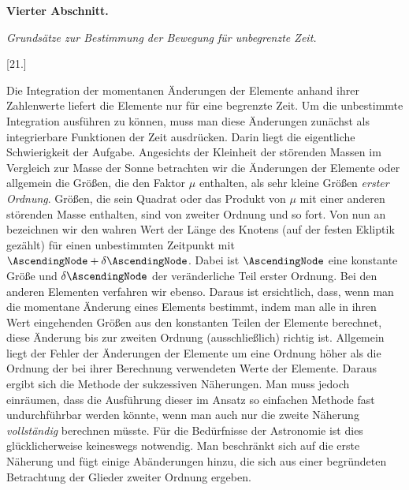 \par{}\bigskip
{}
\begin{center}
{\large\bfseries Vierter Abschnitt.\par}
\medskip
\textit{Grundsätze zur Bestimmung der Bewegung für unbegrenzte Zeit.}
\end{center}
\begin{center}[21.]\end{center}
\noindent\hspace*{\parindent}Die Integration der momentanen Änderungen der Elemente anhand ihrer Zahlenwerte liefert die Elemente nur für eine begrenzte Zeit. Um die unbestimmte Integration ausführen zu können, muss man diese Änderungen zunächst als integrierbare Funktionen der Zeit ausdrücken. Darin liegt die eigentliche Schwierigkeit der Aufgabe. Angesichts der Kleinheit der störenden Massen im Vergleich zur Masse der Sonne betrachten wir die Änderungen der Elemente oder allgemein die Größen, die den Faktor \(\mu\) enthalten, als sehr kleine Größen \textit{erster Ordnung}. Größen, die sein Quadrat oder das Produkt von \(\mu\) mit einer anderen störenden Masse enthalten, sind von zweiter Ordnung und so fort. Von nun an bezeichnen wir den wahren Wert der Länge des Knotens (auf der festen Ekliptik gezählt) für einen unbestimmten Zeitpunkt mit \(\AscendingNode+\delta\AscendingNode\). Dabei ist \(\AscendingNode\) eine konstante Größe und \(\delta\AscendingNode\) der veränderliche Teil erster Ordnung. Bei den anderen Elementen verfahren wir ebenso. Daraus ist ersichtlich, dass, wenn man die momentane Änderung eines Elements bestimmt, indem man alle in ihren Wert eingehenden Größen aus den konstanten Teilen der Elemente berechnet, diese Änderung bis zur zweiten Ordnung (ausschließlich) richtig ist. Allgemein liegt der Fehler der Änderungen der Elemente um eine Ordnung höher als die Ordnung der bei ihrer Berechnung verwendeten Werte der Elemente. Daraus ergibt sich die Methode der sukzessiven Näherungen. Man muss jedoch einräumen, dass die Ausführung dieser im Ansatz so einfachen Methode fast undurchführbar werden könnte, wenn man auch nur die zweite Näherung \textit{vollständig} berechnen müsste. Für die Bedürfnisse der Astronomie ist dies glücklicherweise keineswegs notwendig. Man beschränkt sich auf die erste Näherung und fügt einige Abänderungen hinzu, die sich aus einer begründeten Betrachtung der Glieder zweiter Ordnung ergeben.
